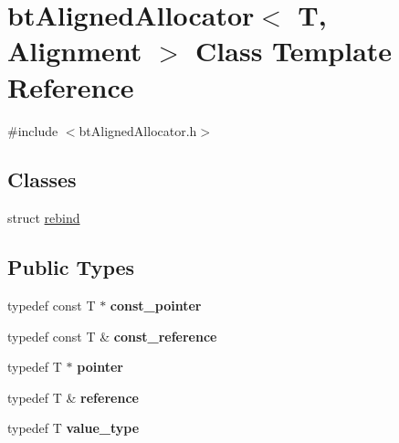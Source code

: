 \hypertarget{classbt_aligned_allocator}{\section{bt\+Aligned\+Allocator$<$ T, Alignment $>$ Class Template Reference}
\label{classbt_aligned_allocator}
}


{\ttfamily \#include $<$bt\+Aligned\+Allocator.\+h$>$}

\subsection*{Classes}
\begin{DoxyCompactItemize}
\item 
struct \hyperlink{structbt_aligned_allocator_1_1rebind}{rebind}
\end{DoxyCompactItemize}
\subsection*{Public Types}
\begin{DoxyCompactItemize}
\item 
\hypertarget{classbt_aligned_allocator_a0e891e100940277ebbd7272040f10e03}{typedef const T $\ast$ {\bfseries const\+\_\+pointer}}\label{classbt_aligned_allocator_a0e891e100940277ebbd7272040f10e03}

\item 
\hypertarget{classbt_aligned_allocator_ae5f6da84ca9c043329e3aae5c7fb3899}{typedef const T \& {\bfseries const\+\_\+reference}}\label{classbt_aligned_allocator_ae5f6da84ca9c043329e3aae5c7fb3899}

\item 
\hypertarget{classbt_aligned_allocator_a437328614e195e0241532556ebb24585}{typedef T $\ast$ {\bfseries pointer}}\label{classbt_aligned_allocator_a437328614e195e0241532556ebb24585}

\item 
\hypertarget{classbt_aligned_allocator_ae700086710c0e3968d6291a58afb5179}{typedef T \& {\bfseries reference}}\label{classbt_aligned_allocator_ae700086710c0e3968d6291a58afb5179}

\item 
\hypertarget{classbt_aligned_allocator_adbcb544104a69cedd789d279c03ff861}{typedef T {\bfseries value\+\_\+type}}\label{classbt_aligned_allocator_adbcb544104a69cedd789d279c03ff861}

\end{DoxyCompactItemize}
